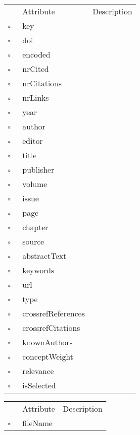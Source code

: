 \begin{table}
\caption{MissingWork  }

\begin{longtable}{llp{8cm}}
& Attribute & Description \\
$\square$\ & key &  \\
$\square$\ & doi &  \\
$\square$\ & encoded &  \\
$\square$\ & nrCited &  \\
$\square$\ & nrCitations &  \\
$\square$\ & nrLinks &  \\
$\square$\ & year &  \\
$\square$\ & author &  \\
$\square$\ & editor &  \\
$\square$\ & title &  \\
$\square$\ & publisher &  \\
$\square$\ & volume &  \\
$\square$\ & issue &  \\
$\square$\ & page &  \\
$\square$\ & chapter &  \\
$\square$\ & source &  \\
$\square$\ & abstractText &  \\
$\square$\ & keywords &  \\
$\square$\ & url &  \\
$\square$\ & type &  \\
$\square$\ & crossrefReferences &  \\
$\square$\ & crossrefCitations &  \\
$\square$\ & knownAuthors &  \\
$\square$\ & conceptWeight &  \\
$\square$\ & relevance &  \\
$\square$\ & isSelected &  \\
\end{longtable}
\label{attr:MissingWork}
\end{table}

\begin{table}
\caption{Orphan  }

\begin{longtable}{llp{8cm}}
& Attribute & Description \\
$\square$\ & fileName &  \\
\end{longtable}
\label{attr:Orphan}
\end{table}

